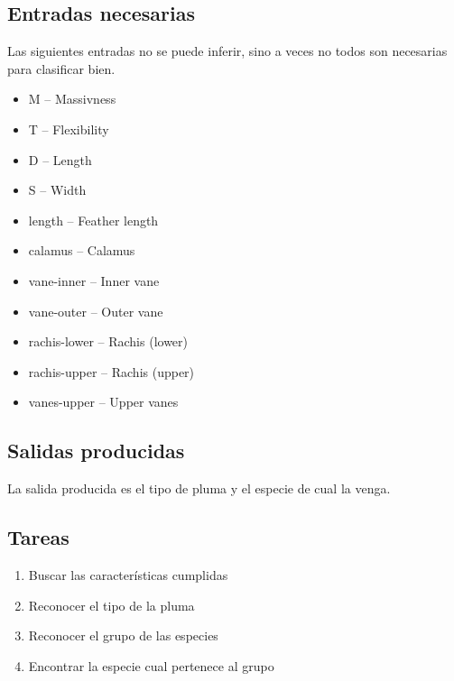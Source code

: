 \documentclass[a4paper,12pt]{article}
\begin{document}
\subsection{Entradas necesarias}
Las siguientes entradas no se puede inferir, sino a veces no todos son necesarias para clasificar bien.
\begin{itemize}
	\item M -- Massivness
	\item T -- Flexibility
	\item D -- Length
	\item S -- Width
	\item length -- Feather length
	\item calamus -- Calamus
	\item vane-inner -- Inner vane
	\item vane-outer -- Outer vane
	\item rachis-lower -- Rachis (lower)
	\item rachis-upper -- Rachis (upper)
	\item vanes-upper -- Upper vanes
\end{itemize}

\subsection{Salidas producidas}
La salida producida es el tipo de pluma y el especie de cual la venga.

\subsection{Tareas}
\begin{enumerate}
	\item Buscar las características cumplidas
	\item Reconocer el tipo de la pluma
	\item Reconocer el grupo de las especies
	\item Encontrar la especie cual pertenece al grupo
\end{enumerate}
\end{document}
